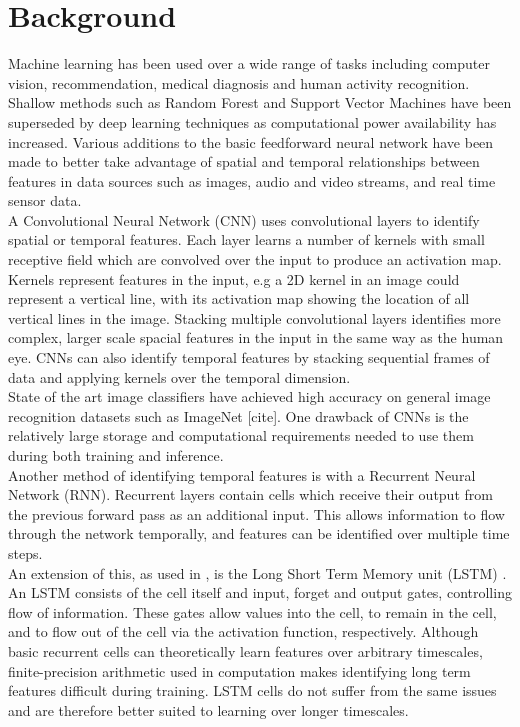 \chapter{Background}

Machine learning has been used over a wide range of tasks including computer vision, recommendation, medical diagnosis and human activity recognition. Shallow methods such as Random Forest and Support Vector Machines have been superseded by deep learning techniques as computational power availability has increased. Various additions to the basic feedforward neural network have been made to better take advantage of spatial and temporal relationships between features in data sources such as images, audio and video streams, and real time sensor data.\\

A Convolutional Neural Network (CNN) \cite{Neocognitron} uses convolutional layers to identify spatial or temporal features. Each layer learns a number of kernels with small receptive field which are convolved over the input to produce an activation map. Kernels represent features in the input, e.g a 2D kernel in an image could represent a vertical line, with its activation map showing the location of all vertical lines in the image. Stacking multiple convolutional layers identifies more complex, larger scale spacial features in the input in the same way as the human eye. CNNs can also identify temporal features by stacking sequential frames of data and applying kernels over the temporal dimension.\\

State of the art image classifiers have achieved high accuracy on general image recognition datasets such as ImageNet [cite]. One drawback of CNNs is the relatively large storage and computational requirements needed to use them during both training and inference.\\

Another method of identifying temporal features is with a Recurrent Neural Network (RNN). Recurrent layers contain cells which receive their output from the previous forward pass as an additional input. This allows information to flow through the network temporally, and features can be identified over multiple time steps.\\

An extension of this, as used in \cite{DeepConvLSTM}, is the Long Short Term Memory unit (LSTM) \cite{LSTM}. An LSTM consists of the cell itself and input, forget and output gates, controlling flow of information. These gates allow values into the cell, to remain in the cell, and to flow out of the cell via the activation function, respectively. Although basic recurrent cells can theoretically learn features over arbitrary timescales, finite-precision arithmetic used in computation makes identifying long term features difficult during training. LSTM cells do not suffer from the same issues and are therefore better suited to learning over longer timescales.\\

